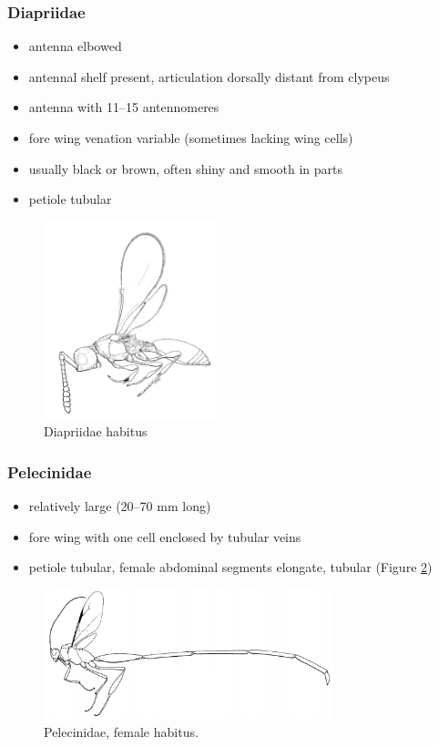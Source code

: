 \documentclass[letterpaper, 11pt]{article}
\begin{document}
\subsubsection{Diapriidae}
\begin{itemize}
\item antenna elbowed
\item antennal shelf present, articulation dorsally distant from clypeus
\item antenna with 11--15 antennomeres
\item fore wing venation variable (sometimes lacking wing cells)
\item usually black or brown, often shiny and smooth in parts
\item petiole tubular
 \end{itemize}

\begin{figure}[ht!]
  \centering
    \includegraphics[width=0.45\textwidth]{DiapriidHabitus}
  \caption{Diapriidae habitus \citep[][Fig. 206]{goulet1993hymenoptera}}
  \label{fig:diapriid1}
\end{figure}

\subsubsection{Pelecinidae}
\begin{itemize}
\item relatively large (20--70 mm long)
\item fore wing with one cell enclosed by tubular veins
\item petiole tubular, female abdominal segments elongate, tubular (Figure \ref{fig:pelecinid1})
\end{itemize}

\begin{figure}[ht!]
  \centering
    \includegraphics[width=0.75\textwidth]{PelecinidHabitus}
  \caption{Pelecinidae, female habitus. \citep[][Fig. 198]{goulet1993hymenoptera}}
  \label{fig:pelecinid1}
\end{figure}
\end{document}
